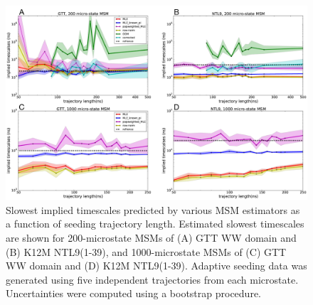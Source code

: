 \documentclass[%
 aip,
rsi,%
 amsmath,amssymb,
 reprint,%
]{revtex4-1}
\begin{document}
\begin{figure}[ht!]
\includegraphics[width=0.55\paperwidth]{figures/Slowest_timescales_only/all_slowest_timescales_cluster_200_and_1000_omi.pdf}
\caption{Slowest implied timescales predicted by various MSM estimators as a function of seeding trajectory length. Estimated slowest timescales are shown for 200-microstate MSMs of (A) GTT WW domain and (B) K12M NTL9(1-39), and 1000-microstate MSMs of (C) GTT WW domain and (D) K12M NTL9(1-39). Adaptive seeding data was generated using five independent trajectories from each microstate. Uncertainties were computed using a bootstrap procedure.}
\label{fig:all-atom-timescales-5seeds}
\end{figure}
\end{document}
